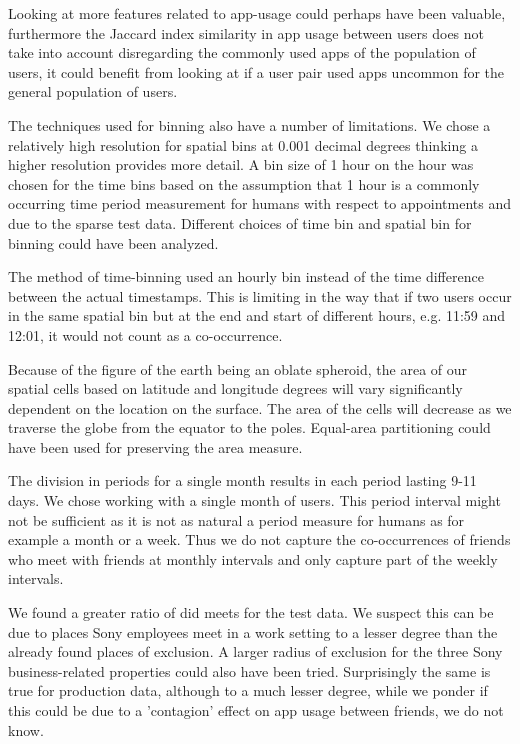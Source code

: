 Looking at more features related to app-usage could perhaps have been valuable, furthermore the Jaccard index similarity in app usage between users does not take into account disregarding the commonly used apps of the population of users, it could benefit from looking at if a user pair used apps uncommon for the general population of users.

The techniques used for binning also have a number of limitations.
We chose a relatively high resolution for spatial bins at 0.001 decimal degrees thinking a higher resolution provides more detail. A bin size of 1 hour on the hour was chosen for the time bins based on the assumption that 1 hour is a commonly occurring time period measurement for humans with respect to appointments and due to the sparse test data. Different choices of time bin and spatial bin for binning could have been analyzed.

The method of time-binning used an hourly bin instead of the time difference between the actual timestamps. This is limiting in the way that if two users occur in the same spatial bin but at the end and start of different hours, e.g. 11:59 and 12:01, it would not count as a co-occurrence.

Because of the figure of the earth being an oblate spheroid, the area of our spatial cells based on latitude and longitude degrees will vary significantly dependent on the location on the surface. The area of the cells will decrease as we traverse the globe from the equator to the poles. Equal-area partitioning could have been used for preserving the area measure.

The division in periods for a single month results in each period lasting 9-11 days. We chose working with a single month of users. This period interval might not be sufficient as it is not as natural a period measure for humans as for example a month or a week. Thus we do not capture the co-occurrences of friends who meet with friends at monthly intervals and only capture part of the weekly intervals.

We found a greater ratio of did meets for the test data. We suspect this can be due to places Sony employees meet in a work setting to a lesser degree than the already found places of exclusion. A larger radius of exclusion for the three Sony business-related properties could also have been tried.
Surprisingly the same is true for production data, although to a much lesser degree, while we ponder if this could be due to a 'contagion' effect on app usage between friends, we do not know.

